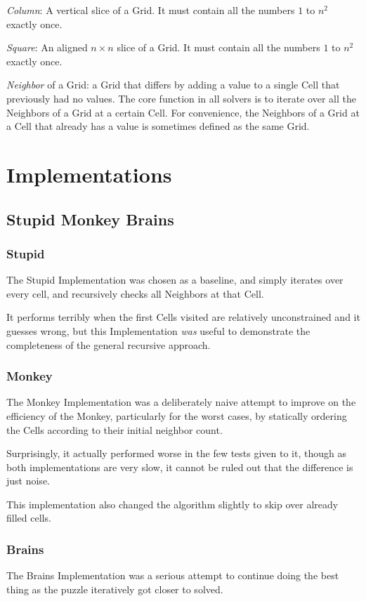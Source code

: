 \documentclass[letterpaper]{article}
\begin{document}
\emph{Column}: A vertical slice of a Grid. It must contain all the
numbers $ 1 $ to $ n^2 $ exactly once.

\emph{Square}: An aligned $ n \times n $ slice of a Grid. It must contain
all the numbers $ 1 $ to $ n^2 $ exactly once.

\emph{Neighbor} of a Grid: a Grid that differs by adding a value to a
single Cell that previously had no values. The core function in all
solvers is to iterate over all the Neighbors of a Grid at a certain Cell.
For convenience, the Neighbors of a Grid at a Cell that already has a value
is sometimes defined as the same Grid.

\section{Implementations}

\subsection{Stupid Monkey Brains}

\subsubsection{Stupid}
The Stupid Implementation was chosen as a baseline, and simply iterates
over every cell, and recursively checks all Neighbors at that Cell.

It performs terribly when the first Cells visited are relatively
unconstrained and it guesses wrong, but this Implementation \emph{was}
useful to demonstrate the completeness of the general recursive approach.

\subsubsection{Monkey}
The Monkey Implementation was a deliberately naive attempt to improve on
the efficiency of the Monkey, particularly for the worst cases, by
statically ordering the Cells according to their initial neighbor count.

Surprisingly, it actually performed worse in the few tests given to it,
though as both implementations are very slow, it cannot be ruled out that
the difference is just noise.

This implementation also changed the algorithm slightly to skip over
already filled cells.

\subsubsection{Brains}
The Brains Implementation was a serious attempt to continue doing the best
thing as the puzzle iteratively got closer to solved.
\end{document}
